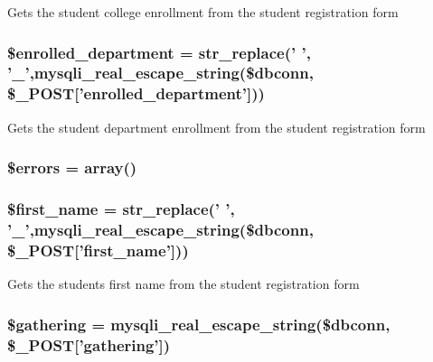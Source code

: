 \-Gets the student college enrollment from the student registration form \hypertarget{user__view_2validate_2studentVal_8php_a2c21a55b0bd902797539f840b7bf94dc}{
\subsubsection[{\$enrolled\-\_\-department}]{\setlength{\rightskip}{0pt plus 5cm}\$enrolled\-\_\-department = str\-\_\-replace(' ', '\-\_\-',mysqli\-\_\-real\-\_\-escape\-\_\-string(\$dbconn, \$\-\_\-\-P\-O\-S\-T\mbox{[}'enrolled\-\_\-department'\mbox{]}))}}\label{user__view_2validate_2studentVal_8php_a2c21a55b0bd902797539f840b7bf94dc}
\-Gets the student department enrollment from the student registration form \hypertarget{user__view_2validate_2studentVal_8php_ab24faf4aa647cdcee494fc48524ad4ff}{
\subsubsection[{\$errors}]{\setlength{\rightskip}{0pt plus 5cm}\$errors = array()}}\label{user__view_2validate_2studentVal_8php_ab24faf4aa647cdcee494fc48524ad4ff}
\hypertarget{user__view_2validate_2studentVal_8php_ae0a75279f3627fb32311bc3352c89fe6}{
\subsubsection[{\$first\-\_\-name}]{\setlength{\rightskip}{0pt plus 5cm}\$first\-\_\-name = str\-\_\-replace(' ', '\-\_\-',mysqli\-\_\-real\-\_\-escape\-\_\-string(\$dbconn, \$\-\_\-\-P\-O\-S\-T\mbox{[}'first\-\_\-name'\mbox{]}))}}\label{user__view_2validate_2studentVal_8php_ae0a75279f3627fb32311bc3352c89fe6}
\-Gets the students first name from the student registration form \hypertarget{user__view_2validate_2studentVal_8php_a0b341ac1da1798a6803878383a2a6086}{
\subsubsection[{\$gathering}]{\setlength{\rightskip}{0pt plus 5cm}\$gathering = mysqli\-\_\-real\-\_\-escape\-\_\-string(\$dbconn, \$\-\_\-\-P\-O\-S\-T\mbox{[}'gathering'\mbox{]})}}\label{user__view_2validate_2studentVal_8php_a0b341ac1da1798a6803878383a2a6086}
